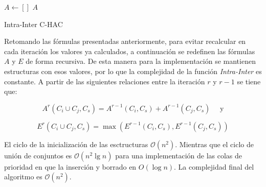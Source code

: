 \begin{center}
	\begin{algorithm}[H]
	\DontPrintSemicolon
	\SetAlgoLined
		$A \leftarrow []$\;
		\Return $A$\;
	\caption{Intra-Inter C-HAC}\label{alg:Intra-Inter C-HAC}
	\end{algorithm}
\end{center}

Retomando las fórmulas presentadas anteriormente, para evitar recalcular en cada iteración los valores ya calculados, a continuación se redefinen las fórmulas $A$ y $E$ de forma recursiva. De esta manera para la implementación se mantienen estructuras con esos valores, por lo que la complejidad de la función \textit{Intra-Inter} es constante. A partir de las siguientes relaciones entre la iteración $r$ y $r-1$ se tiene que:

$$A^r(C_i \cup C_j, C_s) = A^{r-1}(C_i,C_s) + A^{r-1}(C_j,C_s) \quad \mbox{ y}$$

$$E^r(C_i \cup C_j,C_s) = \max (E^{r-1}(C_i,C_s),E^{r-1}(C_j,C_s))$$

El ciclo de la inicialización de las esctructuras $\mathcal{O}(n^{2})$. Mientras que el ciclo de unión de conjuntos es $\mathcal{O}(n^{2}\lg n)$ para una implementación de las colas de prioridad en que la inserción y borrado en $O(\log n)$. La complejidad final del algoritmo es $\mathcal{O}(n^{2})$.


